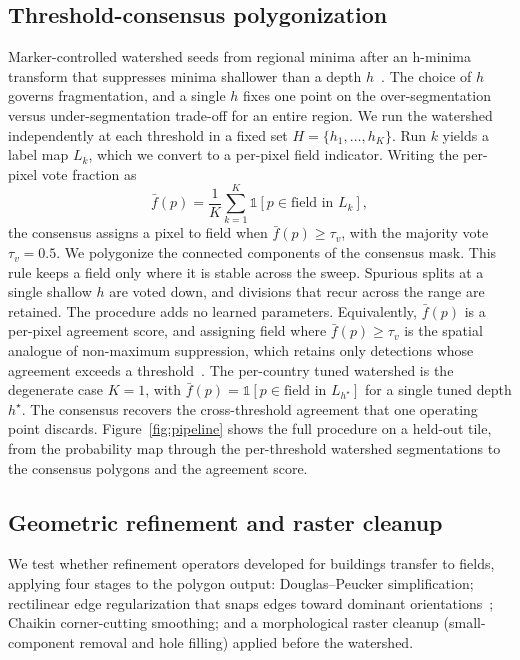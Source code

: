 \documentclass[conference]{IEEEtran}
\begin{document}
\subsection{Threshold-consensus polygonization}
\label{sec:consensus}
Marker-controlled watershed seeds from regional minima after an h-minima transform that suppresses minima shallower than a depth $h$~\cite{koyuncu2016iterative,waldner2020decode}. The choice of $h$ governs fragmentation, and a single $h$ fixes one point on the over-segmentation versus under-segmentation trade-off for an entire region. We run the watershed independently at each threshold in a fixed set $H = \{h_1, \dots, h_K\}$. Run $k$ yields a label map $L_k$, which we convert to a per-pixel field indicator. Writing the per-pixel vote fraction as
\begin{equation}
\bar{f}(p) = \frac{1}{K}\sum_{k=1}^{K}\mathbb{1}[p \in \text{field in } L_k],
\label{eq:vote}
\end{equation}
the consensus assigns a pixel to field when $\bar{f}(p) \geq \tau_v$, with the majority vote $\tau_v = 0.5$. We polygonize the connected components of the consensus mask. This rule keeps a field only where it is stable across the sweep. Spurious splits at a single shallow $h$ are voted down, and divisions that recur across the range are retained. The procedure adds no learned parameters. Equivalently, $\bar{f}(p)$ is a per-pixel agreement score, and assigning field where $\bar{f}(p)\geq\tau_v$ is the spatial analogue of non-maximum suppression, which retains only detections whose agreement exceeds a threshold~\cite{neubeck2006nms,solovyev2021wbf}. The per-country tuned watershed is the degenerate case $K=1$, with $\bar{f}(p)=\mathbb{1}[p\in\text{field in }L_{h^\star}]$ for a single tuned depth $h^\star$. The consensus recovers the cross-threshold agreement that one operating point discards. Figure~\ref{fig:pipeline} shows the full procedure on a held-out tile, from the probability map through the per-threshold watershed segmentations to the consensus polygons and the agreement score.

\subsection{Geometric refinement and raster cleanup}
\label{sec:geometric}
We test whether refinement operators developed for buildings transfer to fields, applying four stages to the polygon output: Douglas--Peucker simplification; rectilinear edge regularization that snaps edges toward dominant orientations~\cite{zorzi2020regularization}; Chaikin corner-cutting smoothing; and a morphological raster cleanup (small-component removal and hole filling) applied before the watershed.
\end{document}

